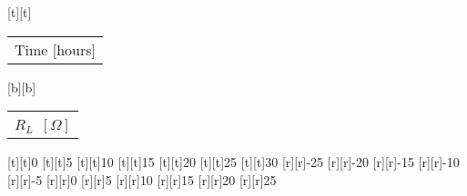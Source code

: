 %    
%
%
%
[t][t]{\color[rgb]{0,0,0}\setlength{\tabcolsep}{0pt}\begin{tabular}{c}Time [hours]\end{tabular}}%
[b][b]{\color[rgb]{0,0,0}\setlength{\tabcolsep}{0pt}\begin{tabular}{c}$R_L$\ $[\Omega]$\end{tabular}}%
%
[t][t]{0}%
[t][t]{5}%
[t][t]{10}%
[t][t]{15}%
[t][t]{20}%
[t][t]{25}%
[t][t]{30}%
%
[r][r]{-25}%
[r][r]{-20}%
[r][r]{-15}%
[r][r]{-10}%
[r][r]{-5}%
[r][r]{0}%
[r][r]{5}%
[r][r]{10}%
[r][r]{15}%
[r][r]{20}%
[r][r]{25}%
%
%
